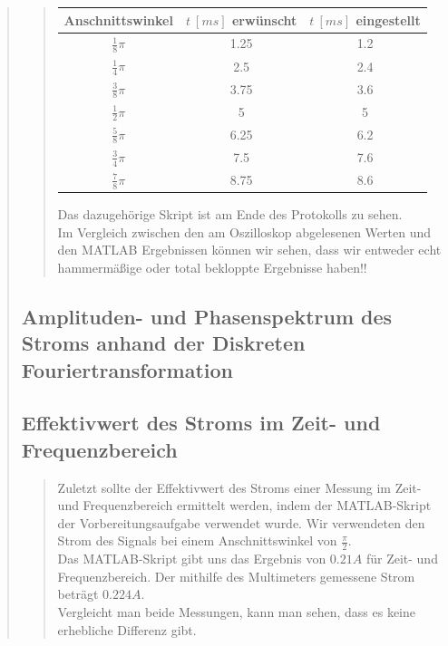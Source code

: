 \begin{quote}
\begin{quote}
\begin{center}
\begin{tabular}{|c|c|c|}
                   \hline
                   Anschnittswinkel & $t\ [ms]$ erwünscht & $t\ [ms]$
                   eingestellt\\ \hline 
                   $\frac{1}{8} \pi$ & 1.25 & 1.2 \\ \hline
                   $\frac{1}{4} \pi$ & 2.5 & 2.4 \\ \hline
                   $\frac{3}{8} \pi$ & 3.75 & 3.6 \\ \hline
                   $\frac{1}{2} \pi$ & 5 & 5 \\ \hline
                   $\frac{5}{8} \pi$ & 6.25 & 6.2 \\ \hline
                   $\frac{3}{4} \pi$ & 7.5 & 7.6 \\ \hline
                   $\frac{7}{8} \pi$ & 8.75 & 8.6 \\ \hline                         
           
                 \end{tabular}
       \end{center}        
       
    Das dazugehörige Skript ist am Ende des Protokolls zu sehen.\\
    
    Im Vergleich zwischen den am Oszilloskop abgelesenen Werten und den MATLAB
    Ergebnissen können wir sehen, dass wir entweder echt hammermäßige oder total
    bekloppte Ergebnisse haben!!
	\end{quote}
	
	\subsection{Amplituden- und Phasenspektrum des Stroms anhand der Diskreten
	Fouriertransformation}
	\begin{quote}
	\end{quote}
	
	\subsection{Effektivwert des Stroms im Zeit- und Frequenzbereich}
	\begin{quote}
	Zuletzt sollte der Effektivwert des Stroms einer Messung im Zeit- und
	Frequenzbereich ermittelt werden, indem der MATLAB-Skript der
	Vorbereitungsaufgabe verwendet wurde. Wir verwendeten den Strom des Signals bei
	einem Anschnittswinkel von $\frac{\pi}{2}$.\\
	Das MATLAB-Skript gibt uns das Ergebnis von $0.21 A$ für Zeit- und
	Frequenzbereich. Der mithilfe des Multimeters gemessene Strom beträgt $0.224
	A$.\\
	
	Vergleicht man beide Messungen, kann man sehen, dass es keine erhebliche
	Differenz gibt.
	
	 
	\end{quote}
\end{quote}

